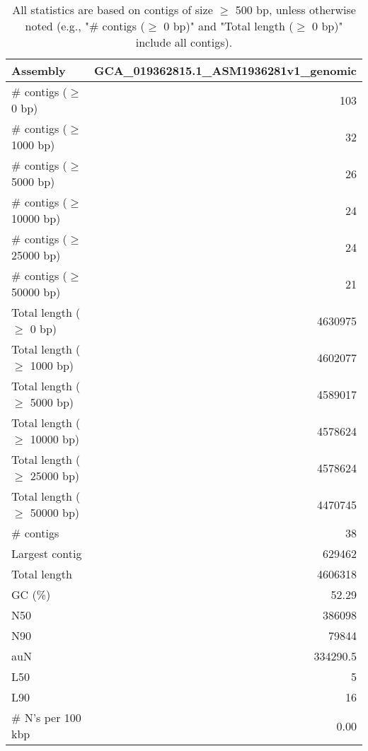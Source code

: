 \documentclass[12pt,a4paper]{article}
\begin{document}
\begin{table}[ht]
\begin{center}
\caption{All statistics are based on contigs of size $\geq$ 500 bp, unless otherwise noted (e.g., "\# contigs ($\geq$ 0 bp)" and "Total length ($\geq$ 0 bp)" include all contigs).}
\begin{tabular}{|l*{1}{|r}|}
\hline
Assembly & GCA\_019362815.1\_ASM1936281v1\_genomic \\ \hline
\# contigs ($\geq$ 0 bp) & 103 \\ \hline
\# contigs ($\geq$ 1000 bp) & 32 \\ \hline
\# contigs ($\geq$ 5000 bp) & 26 \\ \hline
\# contigs ($\geq$ 10000 bp) & 24 \\ \hline
\# contigs ($\geq$ 25000 bp) & 24 \\ \hline
\# contigs ($\geq$ 50000 bp) & 21 \\ \hline
Total length ($\geq$ 0 bp) & 4630975 \\ \hline
Total length ($\geq$ 1000 bp) & 4602077 \\ \hline
Total length ($\geq$ 5000 bp) & 4589017 \\ \hline
Total length ($\geq$ 10000 bp) & 4578624 \\ \hline
Total length ($\geq$ 25000 bp) & 4578624 \\ \hline
Total length ($\geq$ 50000 bp) & 4470745 \\ \hline
\# contigs & 38 \\ \hline
Largest contig & 629462 \\ \hline
Total length & 4606318 \\ \hline
GC (\%) & 52.29 \\ \hline
N50 & 386098 \\ \hline
N90 & 79844 \\ \hline
auN & 334290.5 \\ \hline
L50 & 5 \\ \hline
L90 & 16 \\ \hline
\# N's per 100 kbp & 0.00 \\ \hline
\end{tabular}
\end{center}
\end{table}
\end{document}
